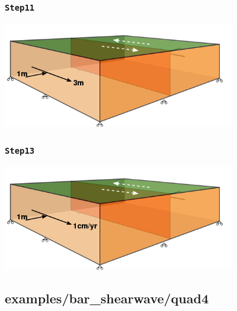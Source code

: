 \documentclass{beamer}
\begin{document}
\begin{frame}
  \frametitle{{\tt Step11}}

  \begin{center}
    \includegraphics[width=4.0in]{figs/step11_schematic}
  \end{center}
  
\end{frame}


\begin{frame}
  \frametitle{{\tt Step13}}
  
  \begin{center}
    \includegraphics[width=4.0in]{figs/step13_schematic}
  \end{center}
  
\end{frame}


\subsection{examples/bar\_shearwave/quad4}
\end{document}
